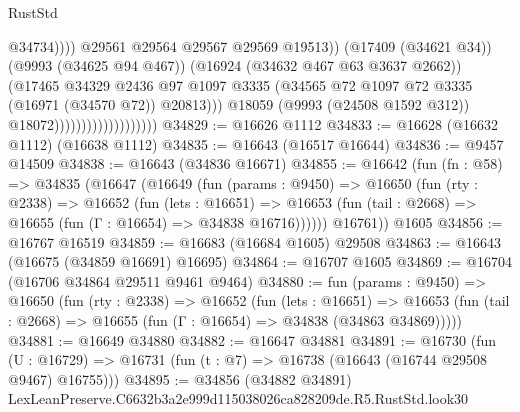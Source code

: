 \begin{lexlean}{RustStd}
\begin{coremodule}
                                                        @34734))))
                                                @29561
                                                @29564
                                                @29567
                                                @29569
                                                @19513))
                                            (@17409 (@34621 @34))
                                            (@9993 (@34625 @94 @467))
                                            (@16924 (@34632 @467 @63 @3637 @2662))
                                            (@17465
                                              @34329
                                              @2436
                                              @97
                                              @1097
                                              @3335
                                              (@34565
                                                @72
                                                @1097
                                                @72
                                                @3335
                                                (@16971 (@34570 @72))
                                                @20813)))
                                          @18059
                                          (@9993 (@24508 @1592 @312))
                                          @18072)))))))))))))))))))
@34829 := @16626 @1112
@34833 := @16628 (@16632 @1112) (@16638 @1112)
@34835 := @16643 (@16517 @16644)
@34836 := @9457 @14509
@34838 := @16643 (@34836 @16671)
@34855 := @16642
    (fun (fn : @58) =>
    @34835
      (@16647
        (@16649
          (fun (params : @9450) =>
          @16650
            (fun (rty : @2338) =>
            @16652
              (fun (lets : @16651) =>
              @16653 (fun (tail : @2668) => @16655 (fun (Γ : @16654) => @34838 @16716))))))
        @16761))
    @1605
@34856 := @16767 @16519
@34859 := @16683 (@16684 @1605) @29508
@34863 := @16643 (@16675 (@34859 @16691) @16695)
@34864 := @16707 @1605
@34869 := @16704 (@16706 @34864 @29511 @9461 @9464)
@34880 := fun (params : @9450) =>
  @16650
    (fun (rty : @2338) =>
    @16652
      (fun (lets : @16651) =>
      @16653 (fun (tail : @2668) => @16655 (fun (Γ : @16654) => @34838 (@34863 @34869)))))
@34881 := @16649 @34880
@34882 := @16647 @34881
@34891 := @16730
    (fun (U : @16729) => @16731 (fun (t : @7) => @16738 (@16643 (@16744 @29508 @9467) @16755)))
@34895 := @34856 (@34882 @34891) LexLeanPreserve.C6632b3a2e999d115038026ca828209de.R5.RustStd.look30

\end{coremodule}
\end{lexlean}
